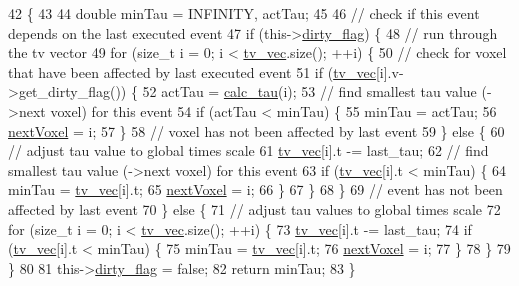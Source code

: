 \begin{DoxyCode}
42                                            \{
43 
44     \textcolor{keywordtype}{double} minTau = INFINITY, actTau;
45 
46 \textcolor{comment}{//  check if this event depends on the last executed event}
47     \textcolor{keywordflow}{if} (this->\hyperlink{classnw_1_1___event_aaa705b35c06c0cb2e0a4f3daa9ee8037}{dirty\_flag}) \{
48 \textcolor{comment}{//      run through the tv vector}
49         \textcolor{keywordflow}{for} (\textcolor{keywordtype}{size\_t} i = 0; i < \hyperlink{classnw_1_1___event_a6351b58d94923ed58e0b2cf6c9445d2e}{tv\_vec}.size(); ++i) \{
50 \textcolor{comment}{//          check for voxel that have been affected by last executed event}
51             \textcolor{keywordflow}{if} (\hyperlink{classnw_1_1___event_a6351b58d94923ed58e0b2cf6c9445d2e}{tv\_vec}[i].v->get\_dirty\_flag()) \{
52                 actTau = \hyperlink{classnw_1_1_diffusion___evt_a45b4ac64dd8f202de5b1e590b7a88621}{calc\_tau}(i);
53 \textcolor{comment}{//              find smallest tau value (->next voxel) for this event}
54                 \textcolor{keywordflow}{if} (actTau < minTau) \{
55                     minTau = actTau;
56                     \hyperlink{classnw_1_1___event_a7864559e204c087306e3becb5b81fb26}{nextVoxel} = i;
57                 \}
58 \textcolor{comment}{//          voxel has not been affected by last event}
59             \} \textcolor{keywordflow}{else} \{
60 \textcolor{comment}{//              adjust tau value to global times scale}
61                 \hyperlink{classnw_1_1___event_a6351b58d94923ed58e0b2cf6c9445d2e}{tv\_vec}[i].t -= last\_tau;
62 \textcolor{comment}{//              find smallest tau value (->next voxel) for this event}
63                 \textcolor{keywordflow}{if} (\hyperlink{classnw_1_1___event_a6351b58d94923ed58e0b2cf6c9445d2e}{tv\_vec}[i].t < minTau) \{
64                     minTau = \hyperlink{classnw_1_1___event_a6351b58d94923ed58e0b2cf6c9445d2e}{tv\_vec}[i].t;
65                     \hyperlink{classnw_1_1___event_a7864559e204c087306e3becb5b81fb26}{nextVoxel} = i;
66                 \}
67             \}
68         \}
69 \textcolor{comment}{//  event has not been affected by last event}
70     \} \textcolor{keywordflow}{else} \{
71 \textcolor{comment}{//      adjust tau values to global times scale}
72         \textcolor{keywordflow}{for} (\textcolor{keywordtype}{size\_t} i = 0; i < \hyperlink{classnw_1_1___event_a6351b58d94923ed58e0b2cf6c9445d2e}{tv\_vec}.size(); ++i) \{
73             \hyperlink{classnw_1_1___event_a6351b58d94923ed58e0b2cf6c9445d2e}{tv\_vec}[i].t -= last\_tau;
74             \textcolor{keywordflow}{if} (\hyperlink{classnw_1_1___event_a6351b58d94923ed58e0b2cf6c9445d2e}{tv\_vec}[i].t < minTau) \{
75                 minTau = \hyperlink{classnw_1_1___event_a6351b58d94923ed58e0b2cf6c9445d2e}{tv\_vec}[i].t;
76                 \hyperlink{classnw_1_1___event_a7864559e204c087306e3becb5b81fb26}{nextVoxel} = i;
77             \}
78         \}
79     \}
80 
81     this->\hyperlink{classnw_1_1___event_aaa705b35c06c0cb2e0a4f3daa9ee8037}{dirty\_flag} = \textcolor{keyword}{false};
82     \textcolor{keywordflow}{return} minTau;
83 \}
\end{DoxyCode}



